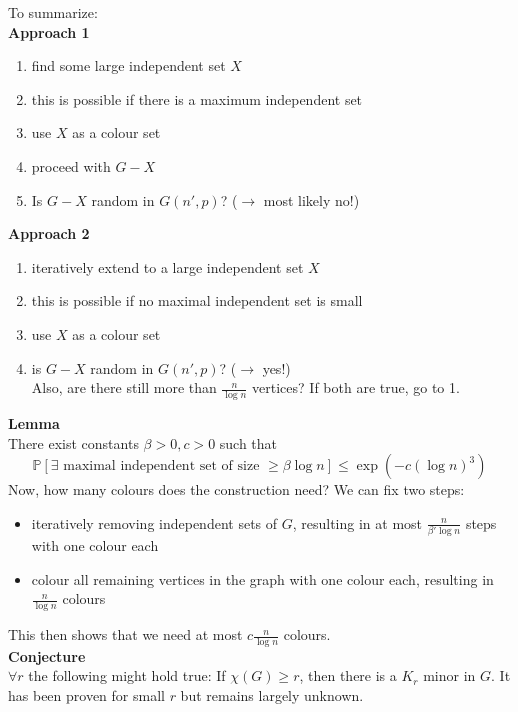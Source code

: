 \documentclass[a4paper, 12pt]{article}
\begin{document}
	To summarize:\\
	\textbf{Approach 1}
	\begin{enumerate}
		\item find some large independent set $X$
		\item this is possible if there is a maximum independent set
		\item use $X$ as a colour set
		\item proceed with $G-X$
		\item Is $G-X$ random in $G(n',p)$? ($\rightarrow$ most likely no!)
	\end{enumerate}
	\textbf{Approach 2}
	\begin{enumerate}
		\item iteratively extend to a large independent set $X$
		\item this is possible if no maximal independent set is small
		\item use $X$ as a colour set
		\item is $G-X$ random in $G(n',p)$? ($\rightarrow$ yes!)\\Also, are there still more than $\frac{n}{\log n}$ vertices? If both are true, go to 1.
	\end{enumerate}
	\textbf{Lemma}\\
	There exist constants $\beta > 0, c >0$ such that \[\mathbb{P}[\exists \text{ maximal independent set of size } \geq \beta\log n] \leq \exp(-c(\log n)^3)\]
	Now, how many colours does the construction need? We can fix two steps:\begin{itemize}
		\item iteratively removing independent sets of $G$, resulting in at most $\frac{n}{\beta' \log n}$ steps with one colour each
		\item colour all remaining vertices in the graph with one colour each, resulting in $\frac{n}{\log n}$ colours
	\end{itemize}
	This then shows that we need at most $c\frac{n}{\log n}$ colours.\\
	\textbf{Conjecture}\\
	$\forall r$ the following might hold true: If $\chi(G) \geq r$, then there is a $K_r$ minor in $G$. It has been proven for small $r$ but remains largely unknown.
\end{document}
